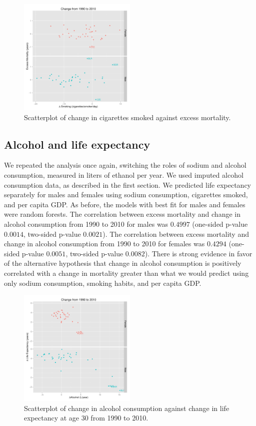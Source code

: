 \documentclass{article}
\begin{document}
\begin{figure}
\centering
\includegraphics[width = 0.5\textwidth]{smoking_exmort.pdf}
\caption{Scatterplot of change in cigarettes smoked against excess mortality.}\label{fig:smoking_excessmortality}
\end{figure}



\subsection{Alcohol and life expectancy}
We repeated the analysis once again, switching the roles of sodium and alcohol consumption, measured in liters of ethanol per year.  We used imputed alcohol consumption data, as described in the first section. We predicted life expectancy separately for males and females using sodium consumption, cigarettes smoked, and per capita GDP.  As before, the models with best fit for males and females were random forests.  The correlation between excess mortality and change in alcohol consumption from 1990 to 2010 for males was $0.4997$ (one-sided p-value $0.0014$, two-sided p-value $0.0021$).  The correlation between excess mortality and change in alcohol consumption from 1990 to 2010 for females was $0.4294$ (one-sided p-value $0.0051$, two-sided p-value $0.0082$).  There is strong evidence in favor of the alternative hypothesis that change in alcohol consumption is positively correlated with a change in mortality greater than what we would predict using only sodium consumption, smoking habits, and per capita GDP.


\begin{figure}
\centering
\includegraphics[width = 0.5\textwidth]{etoh_lifeexp.pdf}
\caption{Scatterplot of change in alcohol consumption against change in life expectancy at age 30 from 1990 to 2010.}\label{fig:etoh_lifeexp}
\end{figure}
\end{document}

